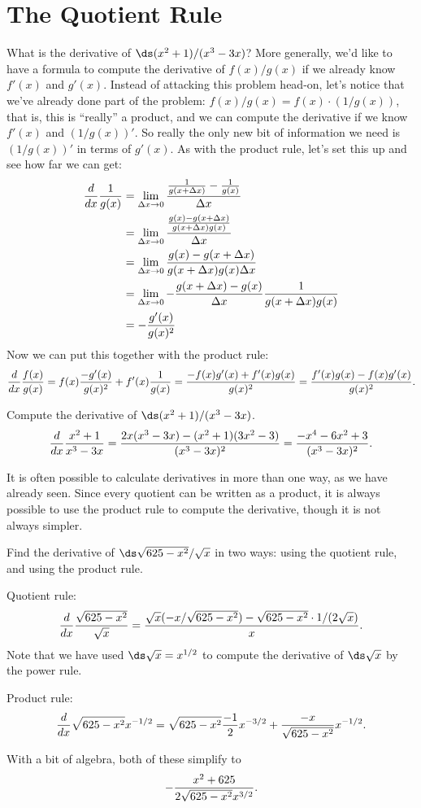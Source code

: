 \section{The Quotient Rule}{}{}

What is the derivative of $\ds (x^2+1)/(x^3-3x)$? More generally, we'd
like to have a formula to compute the derivative of $f(x)/g(x)$ if we
already know $f'(x)$ and $g'(x)$. Instead of attacking this problem
head-on, let's notice that we've already done part of the problem:
$f(x)/g(x)= f(x)\cdot(1/g(x))$, that is, this is ``really'' a product,
and we can compute the derivative if we know $f'(x)$ and
$(1/g(x))'$. So really the only new bit of information we need is
$(1/g(x))'$ in terms of $g'(x)$. As with the product rule, let's set
this up and see how far we can get:
\begin{align*}
{d\over dx}{1\over g(x)}&=\lim_{\Delta x\to0} 
{{1\over g(x+\Delta x)}-{1\over g(x)}\over\Delta x} \\
&=\lim_{\Delta x\to0} {{g(x)-g(x+\Delta x)\over g(x+\Delta x)g(x)}\over\Delta x} \\
&=\lim_{\Delta x\to0} {g(x)-g(x+\Delta x)\over g(x+\Delta x)g(x)\Delta x} \\
&=\lim_{\Delta x\to0} -{g(x+\Delta x)-g(x)\over \Delta x}
 {1\over g(x+\Delta x)g(x)} \\
&=-{g'(x)\over g(x)^2} \\
\end{align*}
Now we can put this together with the product rule:
$${d\over dx}{f(x)\over g(x)}=f(x){-g'(x)\over g(x)^2}+f'(x){1\over
  g(x)}={-f(x)g'(x)+f'(x)g(x)\over g(x)^2}=
  {f'(x)g(x)-f(x)g'(x)\over g(x)^2}.
$$

\begin{example}
Compute the derivative of $\ds (x^2+1)/(x^3-3x)$.
$${d\over dx}{x^2+1\over
  x^3-3x}={2x(x^3-3x)-(x^2+1)(3x^2-3)\over(x^3-3x)^2}=
  {-x^4-6x^2+3\over (x^3-3x)^2}.
$$
\vskip-10pt
\end{example}

It is often possible to calculate derivatives in more than one way, as
we have already seen. Since every quotient can be written as a
product, it is always possible to use the product rule to compute the
derivative, though it is not always simpler.

\begin{example}
Find the derivative of $\ds \sqrt{625-x^2}/\sqrt{x}$ in two ways: using the
quotient rule, and using the product rule.

Quotient rule:
$${d\over dx}{\sqrt{625-x^2}\over\sqrt{x}} = 
{\sqrt{x}(-x/\sqrt{625-x^2})-\sqrt{625-x^2}\cdot 1/(2\sqrt{x})\over
x}.$$
Note that we have used $\ds \sqrt{x}=x^{1/2}$ to compute the derivative of
$\ds \sqrt{x}$ by the power rule.

Product rule:
$${d\over dx}\sqrt{625-x^2} x^{-1/2} = 
\sqrt{625-x^2} {-1\over 2}x^{-3/2}+{-x\over \sqrt{625-x^2}}x^{-1/2}.
$$

With a bit of algebra, both of these simplify to
$$-{x^2+625\over 2\sqrt{625-x^2}x^{3/2}}.$$

\end{example}

